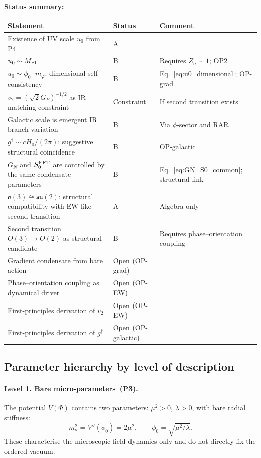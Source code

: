 \documentclass[11pt,a4paper]{article}
\numberwithin{equation}{section}
\begin{document}
\noindent\textbf{Status summary:}
\begin{center}
\renewcommand{\arraystretch}{1.2}
\begin{tabular}{p{5.8cm}p{2.0cm}p{4.0cm}}
\hline
Statement & Status & Comment \\
\hline
Existence of UV scale $u_0$ from P4 & A & \\
$u_0\sim\bar{M}_{\rm Pl}$ & B & Requires $Z_n\sim1$; OP2 \\
$u_0\sim\phi_0\cdot m_\varphi$: dimensional
  self-consistency & B & Eq.~\eqref{eq:u0_dimensional};
  OP-grad \\
$v_2=(\sqrt{2}G_F)^{-1/2}$ as IR matching constraint & Constraint & If second transition exists \\
Galactic scale is emergent IR branch variation & B & Via $\phi$-sector and RAR \\
$g^\dagger\sim cH_0/(2\pi)$: suggestive structural coincidence & B &
  OP-galactic \\
$G_N$ and $S_0^{\rm EFT}$ are controlled by the same
  condensate parameters & B & Eq.~\eqref{eq:GN_S0_common};
  structural link \\
$\mathfrak{o}(3)\cong\mathfrak{su}(2)$: structural compatibility
  with EW-like second transition & A & Algebra only \\
Second transition $O(3)\to O(2)$ as structural candidate & B & Requires phase--orientation coupling \\
Gradient condensate from bare action & Open (OP-grad) & \\
Phase--orientation coupling as dynamical driver & Open (OP-EW) & \\
First-principles derivation of $v_2$ & Open (OP-EW) & \\
First-principles derivation of $g^\dagger$ & Open (OP-galactic) & \\
\hline
\end{tabular}
\end{center}

\subsection{Parameter hierarchy by level of description}
\label{sec:param_hierarchy}

\paragraph{Level 1. Bare micro-parameters~(P3).}
The potential $V(\Phi)$ contains two parameters:
$\mu^2>0$, $\lambda>0$, with bare radial stiffness:
\begin{equation}
  m_\sigma^2 = V''(\phi_0) = 2\mu^2,\qquad
  \phi_0 = \sqrt{\mu^2/\lambda}.
  \label{eq:sigma_mass}
\end{equation}
These characterise the microscopic field dynamics only and
do not directly fix the ordered vacuum.
\end{document}
